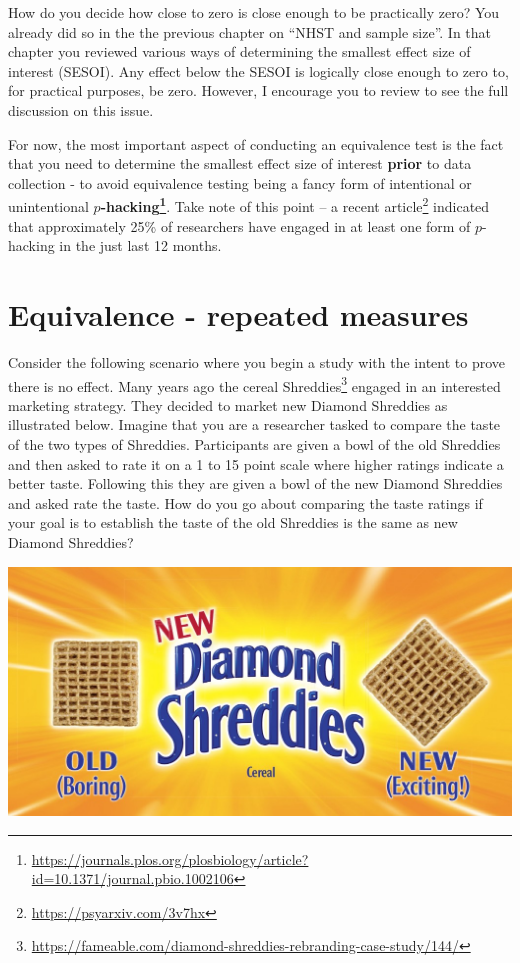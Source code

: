 \documentclass[
]{krantz}
\renewcommand{\href}[2]{#2\footnote{\url{#1}}}
\begin{document}
How do you decide how close to zero is close enough to be practically zero? You already did so in the the previous chapter on ``NHST and sample size''. In that chapter you reviewed various ways of determining the smallest effect size of interest (SESOI). Any effect below the SESOI is logically close enough to zero to, for practical purposes, be zero. However, I encourage you to review \citep{lakens2018equivalence} to see the full discussion on this issue.

For now, the most important aspect of conducting an equivalence test is the fact that you need to determine the smallest effect size of interest \textbf{prior} to data collection - to avoid equivalence testing being a fancy form of intentional or unintentional \textbf{\href{https://journals.plos.org/plosbiology/article?id=10.1371/journal.pbio.1002106}{\(p\)-hacking}}. Take note of this point -- a recent \href{https://psyarxiv.com/3v7hx}{article} indicated that approximately 25\% of researchers have engaged in at least one form of \(p\)-hacking in the just last 12 months.

\hypertarget{equivalence---repeated-measures}{%
\section{Equivalence - repeated measures}\label{equivalence---repeated-measures}}

Consider the following scenario where you begin a study with the intent to prove there is no effect. Many years ago the cereal \href{https://fameable.com/diamond-shreddies-rebranding-case-study/144/}{Shreddies} engaged in an interested marketing strategy. They decided to market new Diamond Shreddies as illustrated below. Imagine that you are a researcher tasked to compare the taste of the two types of Shreddies. Participants are given a bowl of the old Shreddies and then asked to rate it on a 1 to 15 point scale where higher ratings indicate a better taste. Following this they are given a bowl of the new Diamond Shreddies and asked rate the taste. How do you go about comparing the taste ratings if your goal is to establish the taste of the old Shreddies is the same as new Diamond Shreddies?

\includegraphics[width=0.6\linewidth]{ch_equivalence/images/diamond}
\end{document}
